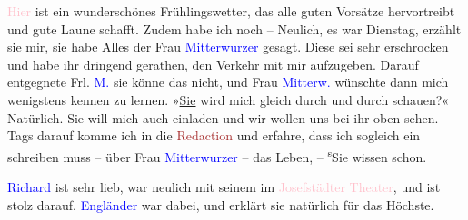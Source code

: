 \pstart
           \textcolor{pink}{Hier}{}\ledrightnote{{$\rightarrow$}\textcolor{pink}{Wien}} ist ein wunderschönes
               Frühlingswetter, das alle guten Vorsätze hervor{\pb}treibt und gute Laune
               schafft. Zudem habe ich noch \label{K_L03169-7v}\label{K_L03169-7h} – Neulich, es war Dienstag, erzählt sie mir, sie habe Alles der Frau \textcolor{blue}{Mitterwurzer}{}\ledrightnote{\textcolor{blue}{Wilhelmine Mitterwurzer}} gesagt. Diese sei sehr erschrocken
               und habe ihr dringend gerathen, den Verkehr mit mir aufzugeben. Darauf entgegnete
               Frl. \textcolor{blue}{M.}{}\ledrightnote{\textcolor{blue}{Ottilie Salten}} sie könne das nicht, und Frau \textcolor{blue}{Mitterw.}{}\ledrightnote{\textcolor{blue}{Wilhelmine Mitterwurzer}} wünschte dann mich wenigstens kennen
               zu lernen. »\uline{Sie} wird mich gleich durch und durch
               schauen?« Natürlich. Sie will mich auch einladen und wir wollen uns bei ihr oben
               sehen. Tags darauf komme ich in die \textcolor{brown}{Redaction}{}\ledrightnote{{$\rightarrow$}\textcolor{brown}{Wiener Allgemeine Zeitung}} und erfahre, dass ich sogleich
               ein \label{K_L03169-8v}\label{K_L03169-8h} schreiben muss – über Frau \textcolor{blue}{Mitterwurzer}{}\ledrightnote{\textcolor{blue}{Wilhelmine Mitterwurzer}} – das Leben, – \substVorne{}\textsuperscript{s}\substDazwischen{}S\substHinten{}ie wissen schon.\pend
           
\pstart
           \textcolor{blue}{Richard}{}\ledrightnote{\textcolor{blue}{Richard Beer-Hofmann}} ist sehr lieb, war neu{\pb}lich mit seinem \label{K_L03169-9v}\label{K_L03169-9h} im \textcolor{pink}{Josefstädter Theater}{}\ledrightnote{\textcolor{pink}{Theater in der Josefstadt}}, und ist stolz darauf. \textcolor{blue}{Engländer}{}\ledrightnote{\textcolor{blue}{Peter Altenberg}} war dabei, und erklärt sie natürlich für das
               Höchste.\pend
           
